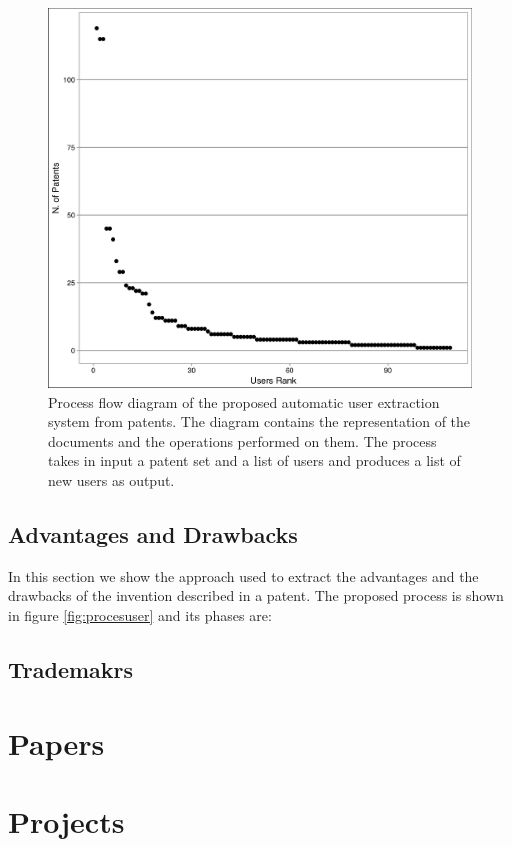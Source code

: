 \documentclass[]{book}
\begin{document}
\begin{figure}

{\centering \includegraphics[width=0.8\linewidth]{_bookdown_files/figures/user_rank} 

}

\caption{Process flow diagram of the proposed automatic user extraction system from patents. The diagram contains the representation of the documents and the operations performed on them. The process takes in input a patent set and a list of users and produces a list of new users as output.}\label{fig:patentsperuser}
\end{figure}

\subsection{Advantages and Drawbacks}\label{advantages-and-drawbacks}

In this section we show the approach used to extract the advantages and
the drawbacks of the invention described in a patent. The proposed
process is shown in figure \ref{fig:procesuser} and its phases are:

\subsection{Trademakrs}\label{trademakrs}

\section{Papers}\label{papers}

\section{Projects}\label{projects}
\end{document}
